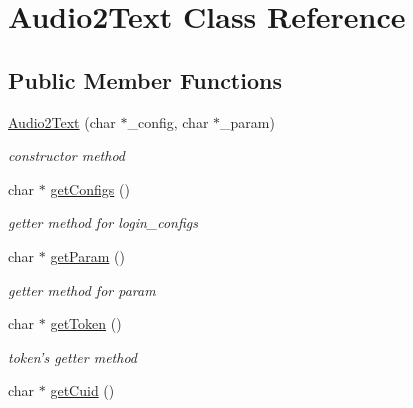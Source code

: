 \hypertarget{classAudio2Text}{\section{\-Audio2\-Text \-Class \-Reference}
\label{classAudio2Text}
}
\subsection*{\-Public \-Member \-Functions}
\begin{DoxyCompactItemize}
\item 
\hyperlink{classAudio2Text_a5404d551ff0f55d22fa2fc13d02274c4}{\-Audio2\-Text} (char $\ast$\-\_\-config, char $\ast$\-\_\-param)
\begin{DoxyCompactList}\small\item\em constructor method \end{DoxyCompactList}\item 
\hypertarget{classAudio2Text_a9792db820d5adc409bd13e8aa56b979d}{char $\ast$ \hyperlink{classAudio2Text_a9792db820d5adc409bd13e8aa56b979d}{get\-Configs} ()}\label{classAudio2Text_a9792db820d5adc409bd13e8aa56b979d}

\begin{DoxyCompactList}\small\item\em getter method for login\-\_\-configs \end{DoxyCompactList}\item 
\hypertarget{classAudio2Text_afac8cda0bc0d8730700eddf42c270d2b}{char $\ast$ \hyperlink{classAudio2Text_afac8cda0bc0d8730700eddf42c270d2b}{get\-Param} ()}\label{classAudio2Text_afac8cda0bc0d8730700eddf42c270d2b}

\begin{DoxyCompactList}\small\item\em getter method for param \end{DoxyCompactList}\item 
\hypertarget{classAudio2Text_a1e3fe0426127bb83f7f4bfb17a3b6adc}{char $\ast$ \hyperlink{classAudio2Text_a1e3fe0426127bb83f7f4bfb17a3b6adc}{get\-Token} ()}\label{classAudio2Text_a1e3fe0426127bb83f7f4bfb17a3b6adc}

\begin{DoxyCompactList}\small\item\em token's getter method \end{DoxyCompactList}\item 
\hypertarget{classAudio2Text_a0b6835dea0cdfadd937fdd55f585712e}{char $\ast$ \hyperlink{classAudio2Text_a0b6835dea0cdfadd937fdd55f585712e}{get\-Cuid} ()}\label{classAudio2Text_a0b6835dea0cdfadd937fdd55f585712e}


\end{DoxyCompactItemize}
